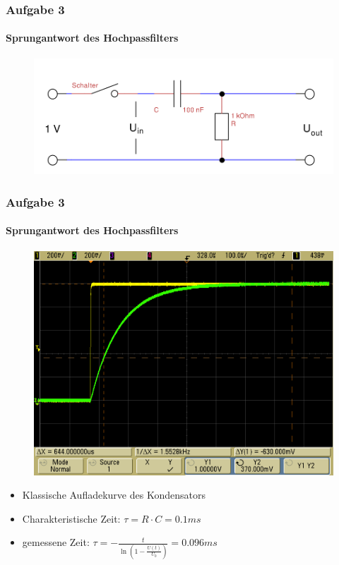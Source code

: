 \begin{frame}
\frametitle{Aufgabe 3}
\framesubtitle{Sprungantwort des Hochpassfilters}
    \begin{figure}[H]
    \begin{center}
            \includegraphics[scale=0.3]{./img/3_schalt.png}
    \end{center}
    \end{figure}
    
\end{frame}
\begin{frame}
    \frametitle{Aufgabe 3}
    \framesubtitle{Sprungantwort des Hochpassfilters}
     \begin{figure}[H]
     \begin{center}
             \includegraphics[scale=0.2]{./img/3_3.png}
     \end{center}
     \end{figure}
     \begin{itemize}
         \item Klassische Aufladekurve des Kondensators
         \item Charakteristische Zeit: $\tau = R \cdot C = 0.1 ms$
         \item gemessene Zeit: $\tau = - \frac{t}{\ln \left( 1-
         \frac{U(t)}{U_0}\right)} = 0.096 ms$
     \end{itemize}
\end{frame}
